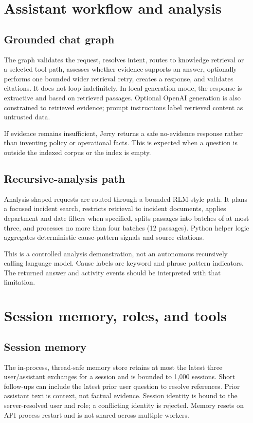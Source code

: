 \documentclass[11pt,a4paper,oneside]{report}
\begin{document}
\chapter{Assistant workflow and analysis}

\section{Grounded chat graph}
The graph validates the request, resolves intent, routes to knowledge retrieval or a selected tool path, assesses whether evidence supports an answer, optionally performs one bounded wider retrieval retry, creates a response, and validates citations. It does not loop indefinitely. In local generation mode, the response is extractive and based on retrieved passages. Optional OpenAI generation is also constrained to retrieved evidence; prompt instructions label retrieved content as untrusted data.

If evidence remains insufficient, Jerry returns a safe no-evidence response rather than inventing policy or operational facts. This is expected when a question is outside the indexed corpus or the index is empty.

\section{Recursive-analysis path}
Analysis-shaped requests are routed through a bounded RLM-style path. It plans a focused incident search, restricts retrieval to incident documents, applies department and date filters when specified, splits passages into batches of at most three, and processes no more than four batches (12 passages). Python helper logic aggregates deterministic cause-pattern signals and source citations.

This is a controlled analysis demonstration, not an autonomous recursively calling language model. Cause labels are keyword and phrase pattern indicators. The returned answer and activity events should be interpreted with that limitation.

\chapter{Session memory, roles, and tools}

\section{Session memory}
The in-process, thread-safe memory store retains at most the latest three user/assistant exchanges for a session and is bounded to 1,000 sessions. Short follow-ups can include the latest prior user question to resolve references. Prior assistant text is context, not factual evidence. Session identity is bound to the server-resolved user and role; a conflicting identity is rejected. Memory resets on API process restart and is not shared across multiple workers.
\end{document}
